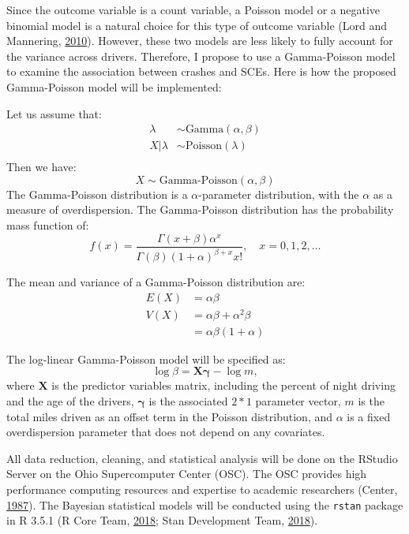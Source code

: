 \documentclass[12pt]{book}
\numberwithin{equation}{chapter}
\begin{document}
Since the outcome variable is a count variable, a Poisson model or a negative binomial model is a natural choice for this type of outcome variable (Lord and Mannering, \protect\hyperlink{ref-lord2010statistical}{2010}). However, these two models are less likely to fully account for the variance across drivers. Therefore, I propose to use a Gamma-Poisson model to examine the association between crashes and SCEs. Here is how the proposed Gamma-Poisson model will be implemented:

Let us assume that:
\[
\begin{aligned}
\lambda & \sim \text{Gamma}(\alpha, \beta)\\
X|\lambda & \sim \text{Poisson}(\lambda)\\
\end{aligned}
\]
Then we have:
\[X \sim \text{Gamma-Poisson}(\alpha, \beta)\]
The Gamma-Poisson distribution is a \(\alpha\)-parameter distribution, with the \(\alpha\) as a measure of overdispersion. The Gamma-Poisson distribution has the probability mass function of:
\[f(x) = \frac{\Gamma(x + \beta)\alpha^x}{\Gamma(\beta)(1 + \alpha)^{\beta + x}x!}, \quad x = 0, 1, 2, \dots\]

The mean and variance of a Gamma-Poisson distribution are:
\[
\begin{aligned}
E(X) & = \alpha\beta \\
V(X) & = \alpha\beta + \alpha^2\beta\\
     & = \alpha\beta(1 + \alpha)
\end{aligned}
\]

The log-linear Gamma-Poisson model will be specified as:
\[
\log\beta = \mathbf{X\gamma} - \log m,
\]
where \(\mathbf{X}\) is the predictor variables matrix, including the percent of night driving and the age of the drivers, \(\mathbf{\gamma}\) is the associated \(2*1\) parameter vector, \(m\) is the total miles driven as an offset term in the Poisson distribution, and \(\alpha\) is a fixed overdispersion parameter that does not depend on any covariates.

All data reduction, cleaning, and statistical analysis will be done on the RStudio Server on the Ohio Supercomputer Center (OSC). The OSC provides high performance computing resources and expertise to academic researchers (Center, \protect\hyperlink{ref-OSC1987}{1987}). The Bayesian statistical models will be conducted using the \texttt{rstan} package in R 3.5.1 (R Core Team, \protect\hyperlink{ref-Rcitation}{2018}; Stan Development Team, \protect\hyperlink{ref-rstancitation}{2018}).
\end{document}
